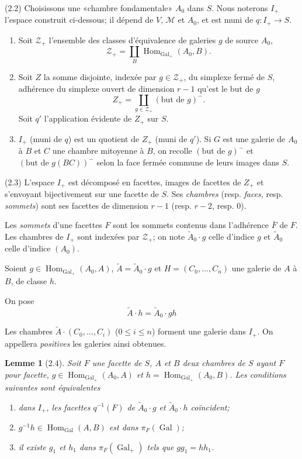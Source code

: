 \documentclass[12pt]{article}
\newtheorem{lemme}[theoreme]{Lemme}
\theoremstyle{remark}
\DeclareMathOperator{\Gal}{Gal}
\DeclareMathOperator{\Hom}{Hom}
\begin{document}
(2.2) Choisissons une «chambre fondamentale» $A_0$ dans $S$. Nous noterons $I_+$ l'espace construit ci-dessous; il dépend de $V$, $\mathcal{M}$ et $A_0$, et est muni de $q \colon I_+ \to S$.

\begin{enumerate}
\item[a)] Soit $\mathscr{Z}_+$ l'ensemble des classes d'équivalence de galeries $g$ de source $A_0$,
\[\mathscr{Z}_+ = \coprod_B \Hom_{\Gal_+}(A_0, B).\]
\item[b)] Soit $Z$ la somme disjointe, indexée par $g \in \mathscr{Z}_+$, du simplexe fermé de $S$, adhérence du simplexe ouvert de dimension $r-1$ qu'est le but de $g$
\[Z_+ = \coprod_{g \in \mathscr{Z}_+} (\text{but de } g)^-.\]
Soit $q'$ l'application évidente de $Z_+$ sur $S$.
\item[c)] $I_+$ (muni de $q$) est un quotient de $Z_+$ (muni de $q'$). Si $G$ est une galerie de $A_0$ à $B$ et $C$ une chambre mitoyenne à $B$, on recolle $(\text{but de } g)^-$ et $(\text{but de } g(BC))^-$ selon la face fermée commune de leurs images dans $S$.
\end{enumerate}

(2.3) L'espace $I_+$ est décomposé en facettes, images de facettes de $Z_+$ et s'envoyant bijectivement sur une facette de $S$. Ses \emph{chambres} (resp. \emph{faces}, resp. \emph{sommets}) sont ses facettes de dimension $r-1$ (resp. $r-2$, resp. $0$).

Les \emph{sommets} d'une facettes $F$ sont les sommets contenus dans l'adhérence $\bar{F}$ de $F$. Les chambres de $I_+$ sont indexées par $\mathscr{Z}_+$; on note $\tilde{A}_0 \cdot g$ celle d'indice $g$ et $\tilde{A}_0$ celle d'indice $(A_0)$.

Soient $g \in \Hom_{\Gal_+}(A_0, A)$, $\tilde{A} = \tilde{A}_0 \cdot g$ et $H = (C_0, \ldots, C_n)$ une galerie de $A$ à $B$, de classe $h$.

On pose
\[\tilde{A} \cdot h = \tilde{A}_0 \cdot gh\]

Les chambres $\tilde{A} \cdot (C_0, \ldots, C_i)$ ($0 \leq i \leq n$) forment une galerie dans $I_+$. On appellera \emph{positives} les galeries ainsi obtenues.

\begin{lemme}[2.4]
Soit $F$ une facette de $S$, $A$ et $B$ deux chambres de $S$ ayant $F$ pour facette, $g \in \Hom_{\Gal_+}(A_0, A)$ et $h = \Hom_{\Gal_+}(A_0, B)$. Les conditions suivantes sont équivalentes
\begin{enumerate}
\item[(a)] dans $I_+$, les facettes $q^{-1}(F)$ de $\tilde{A}_0 \cdot g$ et $\tilde{A}_0 \cdot h$ coïncident;
\item[(b)] $g^{-1} h \in \Hom_{\Gal}(A, B)$ est dans $\pi_F(\Gal)$;
\item[(c)] il existe $g_1$ et $h_1$ dans $\pi_F(\Gal_+)$ tels que $g g_1 = h h_1$.
\end{enumerate}
\end{lemme}
\end{document}

